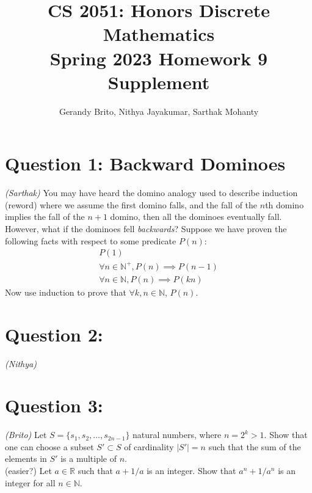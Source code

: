 \documentclass{article}
\title{\vspace{-1cm}CS 2051: Honors Discrete Mathematics \\Spring 2023 Homework 9 Supplement}
\author{Gerandy Brito, Nithya Jayakumar, Sarthak Mohanty}
\date{}
\begin{document}
\maketitle

\section*{Question 1: Backward Dominoes}
    \textit{(Sarthak)} You may have heard the domino analogy used to describe induction (reword) where we assume the first domino falls, and the fall of the $n$th domino implies the fall of the $n + 1$ domino, then all the dominoes eventually fall. However, what if the dominoes fell \textit{backwards}? Suppose we have proven the following facts with respect to some predicate $P(n)$:
    \begin{gather}
        P(1) \\
        \forall n \in \mathbb{N}^{+}, P(n) \implies P(n - 1) \\
        \forall n \in \mathbb{N}, P(n) \implies P(kn)
    \end{gather}
    Now use induction to prove that $\forall k, n \in \mathbb{N}$, $P(n)$.

\section*{Question 2: }
    \textit{(Nithya)}

\section*{Question 3: }
    \textit{(Brito)} Let $S=\{s_1,s_2,\ldots, s_{2n-1}\}$ natural numbers, where $n=2^k>1$. Show that one can choose a subset $S'\subset S$ of cardinality $|S'|=n$ such that the sum of the elements in $S'$ is a multiple of $n$.\\

   (easier?) Let $a\in\mathbb{R}$ such that $a+1/a$ is an integer. Show that $a^n+1/a^n$ is an integer for all $n\in\mathbb{N}$.\\
\end{document}
